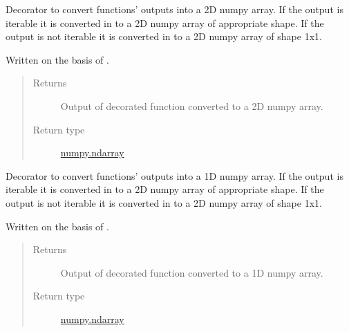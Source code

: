 \documentclass[a4paper,10pt,english]{sphinxmanual}
\begin{document}

\begin{fulllineitems}
\label{aqueduct.utils.helpers:aqueduct.utils.helpers.arrayify}
Decorator to convert functions' outputs into a 2D numpy array. If the output is iterable it is converted in to a 2D numpy array
of appropriate shape. If the output is not iterable it is converted in to a 2D numpy array of shape 1x1.

Written on the basis of {\hyperref[aqueduct.utils.helpers:aqueduct.utils.helpers.listify]{}}.
\begin{quote}\begin{description}
\item[{Returns}] \leavevmode
Output of decorated function converted to a 2D numpy array.

\item[{Return type}] \leavevmode
\href{http://docs.scipy.org/doc/numpy/reference/generated/numpy.ndarray.html\#numpy.ndarray}{numpy.ndarray}

\end{description}\end{quote}

\end{fulllineitems}


\begin{fulllineitems}
\label{aqueduct.utils.helpers:aqueduct.utils.helpers.arrayify1}
Decorator to convert functions' outputs into a 1D numpy array. If the output is iterable it is converted in to a 2D numpy array
of appropriate shape. If the output is not iterable it is converted in to a 2D numpy array of shape 1x1.

Written on the basis of {\hyperref[aqueduct.utils.helpers:aqueduct.utils.helpers.listify]{}}.
\begin{quote}\begin{description}
\item[{Returns}] \leavevmode
Output of decorated function converted to a 1D numpy array.

\item[{Return type}] \leavevmode
\href{http://docs.scipy.org/doc/numpy/reference/generated/numpy.ndarray.html\#numpy.ndarray}{numpy.ndarray}

\end{description}\end{quote}

\end{fulllineitems}
\end{document}
